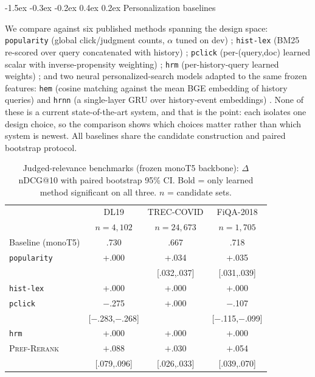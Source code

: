 \documentclass{article}
\makeatletter
\renewcommand{\subsection}{\@startsection{subsection}{2}{\z@}
  {-1.5ex \@plus -0.3ex \@minus -0.2ex}
  {0.4ex \@plus 0.2ex}
  {\normalfont\normalsize\bfseries}}
\makeatother
\begin{document}
\subsection{Personalization baselines}
\label{ssec:baselines}

We compare against six published methods spanning the design space:
\texttt{popularity} (global click/judgment counts, $\alpha$ tuned on dev)
\cite{craswell2007click}; \texttt{hist-lex} (BM25 re-scored over query
concatenated with history) \cite{craswell2008experimental};
\texttt{pclick} (per-(query,doc) learned scalar with inverse-propensity
weighting) \cite{joachims2017unbiased}; \texttt{hrm} (per-history-query learned weights)
\cite{bennett2012hrm}; and two neural personalized-search models adapted
to the same frozen features: \texttt{hem} (cosine matching against the
mean BGE embedding of history queries) \cite{ai2017hem} and \texttt{hrnn}
(a single-layer GRU over history-event embeddings) \cite{ge2018hrnn}.
None of these is a current state-of-the-art system, and that is the
point: each isolates one design choice, so the comparison shows which
choices matter rather than which system is newest. All baselines share
the candidate construction and paired bootstrap protocol.

\begin{table}[t]
\centering
\caption{Judged-relevance benchmarks (frozen monoT5 backbone):
$\Delta$ nDCG@10 with paired bootstrap 95\% CI. Bold = only learned
method significant on all three. $n$ = candidate sets.}
\label{tab:judged}
\small
\setlength{\tabcolsep}{3.5pt}
\begin{tabular}{lccc}
\toprule
 & DL19 & TREC-COVID & FiQA-2018 \\
 & $n{=}4{,}102$ & $n{=}24{,}673$ & $n{=}1{,}705$ \\
\midrule
Baseline (monoT5) & .730 & .667 & .718 \\
\midrule
\texttt{popularity} & +.000 & +{\scriptsize.034} & +{\scriptsize.035} \\
 &  & {\scriptsize[.032,.037]} & {\scriptsize[.031,.039]} \\
\texttt{hist-lex} & +.000 & +.000 & +.000 \\
\texttt{pclick} & $-$.275 & +.000 & $-$.107 \\
 & {\scriptsize[$-$.283,$-$.268]} &  & {\scriptsize[$-$.115,$-$.099]} \\
\texttt{hrm} & +.000 & +.000 & +.000 \\
\midrule
\textsc{Pref-Rerank} & $\mathbf{+}$.088 & $\mathbf{+}$.030 & $\mathbf{+}$.054 \\
 & {\scriptsize[.079,.096]} & {\scriptsize[.026,.033]} & {\scriptsize[.039,.070]} \\
\bottomrule
\end{tabular}
\end{table}
\end{document}

